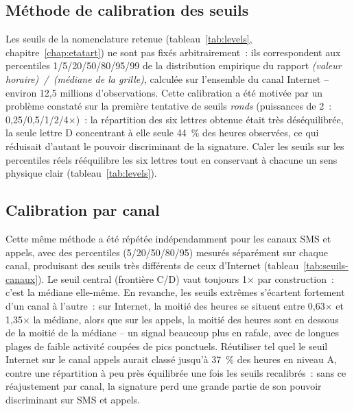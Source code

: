 \subsection{Méthode de calibration des seuils}

Les seuils de la nomenclature retenue (tableau~\ref{tab:levels},
chapitre~\ref{chap:etatart}) ne sont pas fixés arbitrairement~: ils
correspondent aux percentiles 1/5/20/50/80/95/99 de la distribution
empirique du rapport \emph{(valeur horaire)~/~(médiane de la
grille)}, calculée sur l'ensemble du canal Internet -- environ
12,5 millions d'observations. Cette calibration a été motivée par un
problème constaté sur la première tentative de seuils \emph{ronds}
(puissances de 2~: 0,25/0,5/1/2/4$\times$)~: la répartition des six
lettres obtenue était très déséquilibrée, la seule lettre D
concentrant à elle seule 44~\% des heures observées, ce qui réduisait
d'autant le pouvoir discriminant de la signature. Caler les seuils sur
les percentiles réels rééquilibre les six lettres tout en conservant à
chacune un sens physique clair (tableau~\ref{tab:levels}).

\subsection{Calibration par canal}

Cette même méthode a été répétée indépendamment pour les canaux SMS
et appels, avec des percentiles (5/20/50/80/95) mesurés séparément sur
chaque canal, produisant des seuils très différents de ceux
d'Internet (tableau~\ref{tab:seuils-canaux}). Le seuil central
(frontière C/D) vaut toujours 1$\times$ par construction~: c'est la
médiane elle-même. En revanche, les seuils extrêmes s'écartent
fortement d'un canal à l'autre~: sur Internet, la moitié des heures se
situent entre 0,63$\times$ et 1,35$\times$ la médiane, alors que sur
les appels, la moitié des heures sont en dessous de la moitié de la
médiane -- un signal beaucoup plus en rafale, avec de longues plages
de faible activité coupées de pics ponctuels. Réutiliser tel quel le
seuil Internet sur le canal appels aurait classé jusqu'à 37~\% des
heures en niveau A, contre une répartition à peu près équilibrée une
fois les seuils recalibrés~: sans ce réajustement par canal, la
signature perd une grande partie de son pouvoir discriminant sur SMS
et appels.

